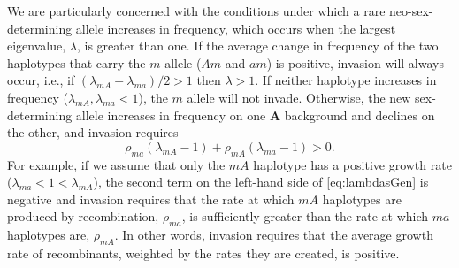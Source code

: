 \documentclass[12pt]{article}
\begin{document}

We are particularly concerned with the conditions under which a rare neo-sex-determining allele increases in frequency, which occurs when the largest eigenvalue, $\lambda$, is greater than one. 
If the average change in frequency of the two haplotypes that carry the $m$ allele ($Am$ and $am$) is positive, invasion will always occur, i.e., if $(\lambda_{mA} + \lambda_{ma})/2 > 1$ then $\lambda > 1$. 
If neither haplotype increases in frequency ($\lambda_{mA}, \lambda_{ma} < 1$), the $m$ allele will not invade. 
Otherwise, the new sex-determining allele increases in frequency on one \textbf{A} background and declines on the other, and invasion requires 
\begin{equation}\label{eq:lambdasGen}
\rho_{ma}\left(\lambda_{mA}-1\right)+\rho_{mA}\left(\lambda_{ma}-1\right)>0.
\end{equation}
\noindent For example, if we assume that only the $mA$ haplotype has a positive growth rate ($\lambda_{ma}<1<\lambda_{mA}$), the second term on the left-hand side of \eqref{eq:lambdasGen} is negative and invasion requires that the rate at which $mA$ haplotypes are produced by recombination, $\rho_{ma}$, is sufficiently greater than the rate at which $ma$ haplotypes are, $\rho_{mA}$.
In other words, invasion requires that the average growth rate of recombinants, weighted by the rates they are created, is positive.
\end{document}
